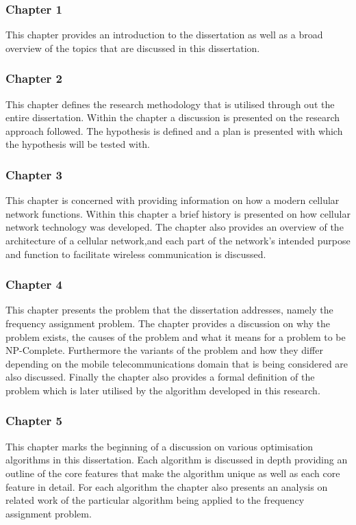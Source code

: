 \subsubsection{Chapter 1}
This chapter provides an introduction to the dissertation as well as a broad overview of the topics that are discussed in this dissertation.
\subsubsection{Chapter 2}
This chapter defines the research methodology that is utilised through out the entire dissertation. Within the chapter a discussion is presented on the research approach followed. The hypothesis is defined and a plan is presented with which the hypothesis will be tested with.
\subsubsection{Chapter 3}
This chapter is concerned with providing information on how a modern cellular network functions. Within this chapter a brief history is presented on how cellular network technology was developed. The chapter also provides an overview of the architecture of a cellular network,and each part of the network's intended purpose and function to facilitate wireless communication is discussed.
\subsubsection{Chapter 4}
This chapter presents the problem that the dissertation addresses, namely the frequency assignment problem. The chapter provides a discussion on why the problem exists, the causes of the problem and what it means for a problem to be NP-Complete. Furthermore the variants of the problem and how they differ depending on the mobile telecommunications domain that is being considered are also discussed. Finally the chapter also provides a formal definition of the problem which is later utilised by the algorithm developed in this research.
\subsubsection{Chapter 5}
This chapter marks the beginning of a discussion on various optimisation algorithms in this dissertation. Each algorithm is discussed in depth providing an outline of the core features that make the algorithm unique as well as each core feature in detail. For each algorithm the chapter also presents an analysis on related work of the particular algorithm being applied to the frequency assignment problem. 
